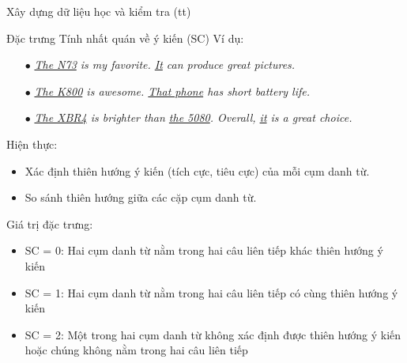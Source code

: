 \documentclass[9pt,xcolor=table,hyperref=unicode]{beamer}
\begin{document}
	\begin{frame}{Xây dựng dữ liệu học và kiểm tra (tt)}
		\begin{block}{Đặc trưng Tính nhất quán về ý kiến (SC)}		
			Ví dụ:\\
			\begin{itemize}				
				\item[$\bullet$]{\textit{\underline{The N73} is my favorite. \underline{It} can produce great pictures.}}
				\item[$\bullet$]{\textit{\underline{The K800} is awesome. \underline{That phone} has short battery life.}}
				\item[$\bullet$]{\textit{\underline{The XBR4} is brighter than \underline{the 5080}. Overall, \underline{it} is a great choice.}}
			\end{itemize}
			Hiện thực: \\
				\begin{itemize}
					\item{Xác định thiên hướng ý kiến (tích cực, tiêu cực) của mỗi cụm danh từ.}
					\item{So sánh thiên hướng giữa các cặp cụm danh từ.}
				\end{itemize}
			Giá trị đặc trưng: \\
			\begin{itemize}
				\item{SC = 0: Hai cụm danh từ nằm trong hai câu liên tiếp khác thiên hướng ý kiến}
				\item{SC = 1: Hai cụm danh từ nằm trong hai câu liên tiếp có cùng thiên hướng ý kiến}
				\item{SC = 2: Một trong hai cụm danh từ không xác định được thiên hướng ý kiến hoặc chúng không nằm trong hai câu liên tiếp}
			\end{itemize}									
		\end{block}	
				
	\end{frame}	
\end{document}
